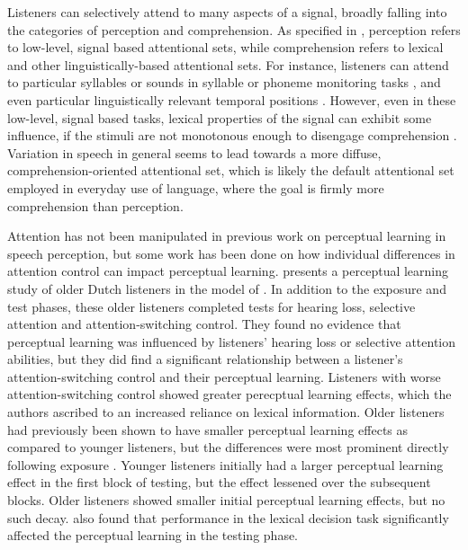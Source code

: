 Listeners can selectively attend to many aspects of a signal, broadly falling into the categories of perception and comprehension.
As specified in \citet{Cutler1987}, perception refers to low-level, signal based attentional sets, while comprehension refers to lexical and other linguistically-based attentional sets.
For instance, listeners can attend to particular syllables or sounds in syllable or phoneme monitoring tasks \citep[and others]{Norris1988}, and even particular linguistically relevant temporal positions \citep{Pitt1990}.
However, even in these low-level, signal based tasks, lexical properties of the signal can exhibit some influence, if the stimuli are not monotonous enough to disengage comprehension \citep{Cutler1987}.  
Variation in speech in general seems to lead towards a more diffuse, comprehension-oriented attentional set, which is likely the default attentional set employed in everyday use of language, where the goal is firmly more comprehension than perception.

Attention has not been manipulated in previous work on perceptual learning in speech perception, but some work has been done on how individual differences in attention control can impact perceptual learning.
\citet{Scharenborg2014} presents a perceptual learning study of older Dutch listeners in the model of \citet{Norris2003}.  
In addition to the exposure and test phases, these older listeners completed tests for hearing loss, selective attention and attention-switching control.  
They found no evidence that perceptual learning was influenced by listeners' hearing loss or selective attention abilities, but they did find a significant relationship between a listener's attention-switching control and their perceptual learning.  
Listeners with worse attention-switching control showed greater perecptual learning effects, which the authors ascribed to an increased reliance on lexical information.  
Older listeners had previously been shown to have smaller perceptual learning effects as compared to younger listeners, but the differences were most prominent directly following exposure \citep{Scharenborg2013}.  
Younger listeners initially had a larger perceptual learning effect in the first block of testing, but the effect lessened over the subsequent blocks.  
Older listeners showed smaller initial perceptual learning effects, but no such decay.  
\citet{Scharenborg2013} also found that performance in the lexical decision task significantly affected the perceptual learning in the testing phase.

